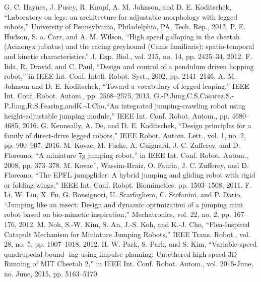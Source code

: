 \begin{translation}
[14] G. C. Haynes, J. Pusey, R. Knopf, A. M. Johnson, and D. E. Koditschek, “Laboratory on legs: an architecture for adjustable morphology with legged robots,” University of Pennsylvania, Philadelphia, PA, Tech. Rep., 2012. \newline
[15] P. E. Hudson, S. a. Corr, and A. M. Wilson, “High speed galloping in the cheetah (Acinonyx jubatus) and the racing greyhound (Canis familiaris): spatio-temporal and kinetic characteristics.” J. Exp. Biol., vol. 215, no. 14, pp. 2425–34, 2012. \newline
[16] F. Iida, R. Dravid, and C. Paul, “Design and control of a pendulum driven hopping robot,” in IEEE Int. Conf. Intell. Robot. Syst., 2002, pp. 2141–2146. \newline
[17] A. M. Johnson and D. E. Koditschek, “Toward a vocabulary of legged leaping,” IEEE Int. Conf. Robot. Autom., pp. 2568–2575, 2013. \newline
[18] G.-P.Jung,C.S.Casarez,S.-P.Jung,R.S.Fearing,andK.-J.Cho,“An integrated jumping-crawling robot using height-adjustable jumping module,” IEEE Int. Conf. Robot. Autom., pp. 4680–4685, 2016. \newline
[19] G. Kenneally, A. De, and D. E. Koditschek, “Design principles for a family of direct-drive legged robots,” IEEE Robot. Autom. Lett., vol. 1, no. 2, pp. 900–907, 2016. \newline
[20] M. Kovac, M. Fuchs, A. Guignard, J.-C. Zufferey, and D. Floreano, “A miniature 7g jumping robot,” in IEEE Int. Conf. Robot. Autom., 2008, pp. 373–378. \newline
[21] M. Kovacˇ, Wassim-Hraiz, O. Fauria, J. C. Zufferey, and D. Floreano, “The EPFL jumpglider: A hybrid jumping and gliding robot with rigid or folding wings,” IEEE Int. Conf. Robot. Biomimetics, pp. 1503–1508, 2011. \newline
[22] F. Li, W. Liu, X. Fu, G. Bonsignori, U. Scarfogliero, C. Stefanini, and P. Dario, “Jumping like an insect: Design and dynamic optimization of a jumping mini robot based on bio-mimetic inspiration,” Mechatronics, vol. 22, no. 2, pp. 167–176, 2012. \newline
[23] M. Noh, S.-W. Kim, S. An, J.-S. Koh, and K.-J. Cho, “Flea-Inspired Catapult Mechanism for Miniature Jumping Robots,” IEEE Trans. Robot., vol. 28, no. 5, pp. 1007–1018, 2012. \newline
[24] H. W. Park, S. Park, and S. Kim, “Variable-speed quadrupedal bound- ing using impulse planning: Untethered high-speed 3D Running of MIT Cheetah 2,” in IEEE Int. Conf. Robot. Autom., vol. 2015-June, no. June, 2015, pp. 5163–5170. \newline

\end{translation}
